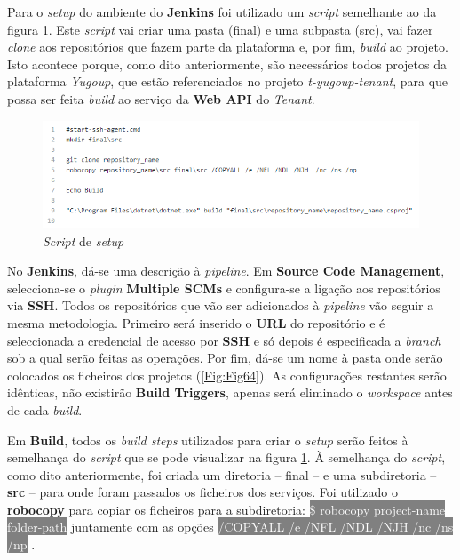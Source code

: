 \hspace{1cm}Para o \textit{setup} do ambiente do \textbf{Jenkins} foi utilizado um \textit{script} semelhante ao da figura \ref{Fig:Fig63}. Este \textit{script} vai criar uma pasta (final) e uma subpasta (src), vai fazer \textit{clone} aos repositórios que fazem parte da plataforma e, por fim, \textit{build} ao projeto. Isto acontece porque, como dito anteriormente, são necessários todos projetos da plataforma \textit{Yugoup}, que estão referenciados no projeto \textit{t-yugoup-tenant}, para que possa ser feita \textit{build} ao serviço da \textbf{Web API} do \textit{Tenant}.

\begin{figure}[hbt!]
\centering
\includegraphics[width=0.9\linewidth]{Cap6/SetupEnvScript.png}
\caption{\textit{Script} de \textit{setup}}
\label{Fig:Fig63}
\end{figure}

\hspace{1cm}No \textbf{Jenkins}, dá-se uma descrição à \textit{pipeline}. Em \textbf{Source Code Management}, selecciona-se o \textit{plugin} \textbf{Multiple SCMs} e configura-se a ligação aos repositórios via \textbf{SSH}. Todos os repositórios que vão ser adicionados à \textit{pipeline} vão seguir a mesma metodologia. Primeiro será inserido o \textbf{URL} do repositório e é seleccionada a credencial de acesso por \textbf{SSH} e só depois é especificada a \textit{branch} sob a qual serão feitas as operações. Por fim, dá-se um nome à pasta onde serão colocados os ficheiros dos projetos (\ref{Fig:Fig64}). As configurações restantes serão idênticas, não existirão \textbf{Build Triggers}, apenas será eliminado o \textit{workspace} antes de cada \textit{build}. 

\hspace{1cm}Em \textbf{Build}, todos os \textit{build steps} utilizados para criar o \textit{setup} serão feitos à semelhança do \textit{script} que se pode visualizar na figura \ref{Fig:Fig63}. À semelhança do \textit{script}, como dito anteriormente, foi criada um diretoria -- final -- e uma subdiretoria -- \textbf{src} -- para onde foram passados os ficheiros dos serviços. Foi utilizado o \textbf{robocopy} para copiar os ficheiros para a subdiretoria: \colorbox{gray}{\textcolor{white}{\$ robocopy project-name folder-path}} juntamente com as opções \colorbox{gray}{\textcolor{white}{/COPYALL /e /NFL /NDL /NJH  /nc /ns /np}} \cite{robocopy}.

